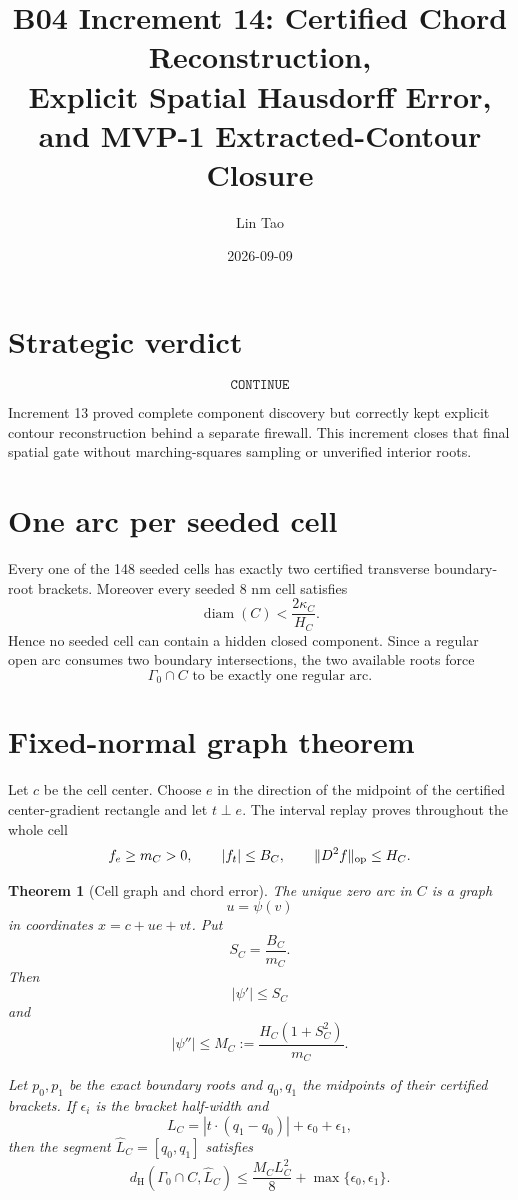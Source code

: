 \documentclass[11pt]{article}
\title{B04 Increment 14: Certified Chord Reconstruction,\\
Explicit Spatial Hausdorff Error, and MVP-1 Extracted-Contour Closure}
\author{Lin Tao}
\date{2026-09-09}
\newtheorem{theorem}{Theorem}
\newcommand{\dH}{d_{\mathrm H}}
\begin{document}
\maketitle

\section*{Strategic verdict}
\[
\boxed{\texttt{CONTINUE}}
\]

Increment 13 proved complete component discovery but correctly kept explicit
contour reconstruction behind a separate firewall. This increment closes
that final spatial gate without marching-squares sampling or unverified
interior roots.

\section{One arc per seeded cell}

Every one of the 148 seeded cells has exactly two certified transverse
boundary-root brackets. Moreover every seeded 8 nm cell satisfies
\[
\operatorname{diam}(C)<\frac{2\kappa_C}{H_C}.
\]
Hence no seeded cell can contain a hidden closed component. Since a regular
open arc consumes two boundary intersections, the two available roots force
\[
\boxed{\Gamma_0\cap C\text{ to be exactly one regular arc}.}
\]

\section{Fixed-normal graph theorem}

Let \(c\) be the cell center. Choose \(e\) in the direction of the midpoint
of the certified center-gradient rectangle and let \(t\perp e\).
The interval replay proves throughout the whole cell
\[
f_e\ge m_C>0,\qquad |f_t|\le B_C,
\qquad \|D^2f\|_{\rm op}\le H_C.
\]

\begin{theorem}[Cell graph and chord error]
The unique zero arc in \(C\) is a graph
\[
u=\psi(v)
\]
in coordinates \(x=c+ue+vt\). Put
\[
S_C=\frac{B_C}{m_C}.
\]
Then
\[
|\psi'|\le S_C
\]
and
\[
\boxed{
|\psi''|
\le
M_C:=
\frac{H_C(1+S_C^2)}{m_C}.
}
\]

Let \(p_0,p_1\) be the exact boundary roots and \(q_0,q_1\) the midpoints of
their certified brackets. If \(\epsilon_i\) is the bracket half-width and
\[
L_C
=
|t\cdot(q_1-q_0)|+\epsilon_0+\epsilon_1,
\]
then the segment \(\widehat L_C=[q_0,q_1]\) satisfies
\[
\boxed{
\dH(\Gamma_0\cap C,\widehat L_C)
\le
\frac{M_CL_C^2}{8}
+
\max\{\epsilon_0,\epsilon_1\}.
}
\]
\end{theorem}
\end{document}
